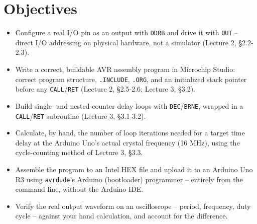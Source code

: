 \documentclass[11pt]{article}
\begin{document}
\labheader

\section*{Objectives}
\begin{itemize}[leftmargin=*,nosep]
  \item Configure a real I/O pin as an output with \texttt{DDRB} and drive it with
        \texttt{OUT} -- direct I/O addressing on physical hardware, not a simulator
        (Lecture 2, \S2.2-2.3).
  \item Write a correct, buildable AVR assembly program in Microchip Studio: correct
        program structure, \texttt{.INCLUDE}, \texttt{.ORG}, and an initialized stack
        pointer before any \texttt{CALL}/\texttt{RET} (Lecture 2, \S2.5-2.6; Lecture 3,
        \S3.2).
  \item Build single- and nested-counter delay loops with \texttt{DEC}/\texttt{BRNE},
        wrapped in a \texttt{CALL}/\texttt{RET} subroutine (Lecture 3, \S3.1-3.2).
  \item Calculate, by hand, the number of loop iterations needed for a target time
        delay at the Arduino Uno's actual crystal frequency (16 MHz), using the
        cycle-counting method of Lecture 3, \S3.3.
  \item Assemble the program to an Intel HEX file and upload it to an Arduino Uno R3
        using \texttt{avrdude}'s Arduino (bootloader) programmer -- entirely from the
        command line, without the Arduino IDE.
  \item Verify the real output waveform on an oscilloscope -- period, frequency, duty
        cycle -- against your hand calculation, and account for the difference.
\end{itemize}
\end{document}
